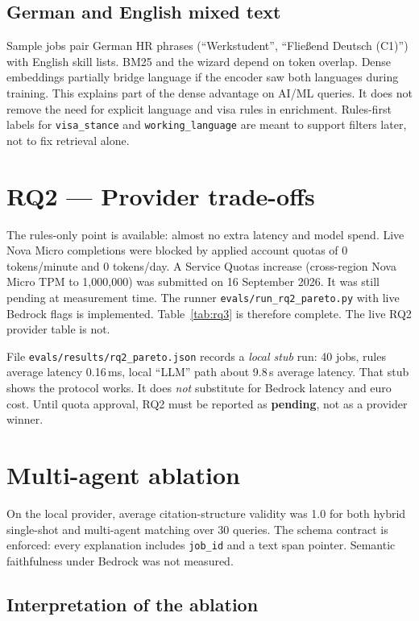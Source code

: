 \subsection{German and English mixed text}

Sample jobs pair German HR phrases (``Werkstudent'', ``Flie{\ss}end Deutsch (C1)'') with English skill lists. BM25 and the wizard depend on token overlap. Dense embeddings partially bridge language if the encoder saw both languages during training. This explains part of the dense advantage on AI/ML queries. It does not remove the need for explicit language and visa rules in enrichment. Rules-first labels for \texttt{visa\_stance} and \texttt{working\_language} are meant to support filters later, not to fix retrieval alone.

\section{RQ2 --- Provider trade-offs}
\label{sec:rq2}

The rules-only point is available: almost no extra latency and  model spend. Live Nova Micro completions were blocked by applied account quotas of 0 tokens/minute and 0 tokens/day. A Service Quotas increase (cross-region Nova Micro TPM to 1{,}000{,}000) was submitted on 16 September 2026. It was still pending at measurement time. The runner \texttt{evals/run\_rq2\_pareto.py} with live Bedrock flags is implemented. Table~\ref{tab:rq3} is therefore complete. The live RQ2 provider table is not.

File \texttt{evals/results/rq2\_pareto.json} records a \emph{local stub} run: 40 jobs, rules average latency 0.16\,ms, local ``LLM'' path about 9.8\,s average latency. That stub shows the protocol works. It does \emph{not} substitute for Bedrock latency and euro cost. Until quota approval, RQ2 must be reported as \textbf{pending}, not as a provider winner.

\section{Multi-agent ablation}
\label{sec:agent}

On the local provider, average citation-structure validity was 1.0 for both hybrid single-shot and multi-agent matching over 30 queries. The schema contract is enforced: every explanation includes \texttt{job\_id} and a text span pointer. Semantic faithfulness under Bedrock was not measured.

\subsection{Interpretation of the ablation}

